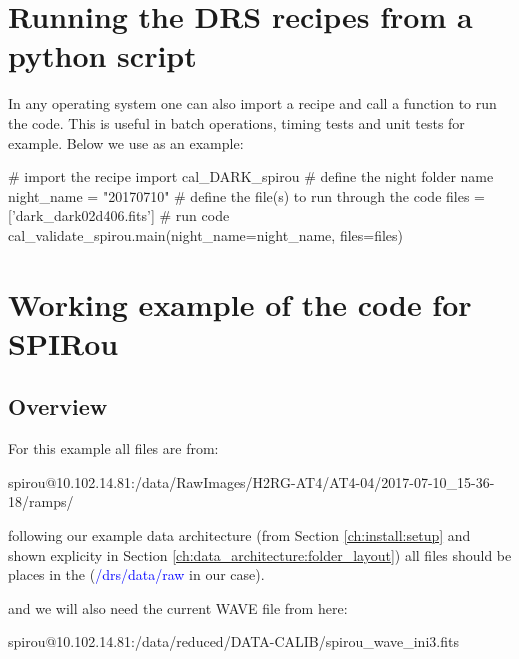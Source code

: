 \section{Running the DRS recipes from a python script}
\label{chapter:using_the_drs:script}

In any operating system one can also import a recipe and call a function to run the code. This is useful in batch operations, timing tests and unit tests for example. Below we use \calDARK as an example:

\begin{pythonbox}
# import the recipe
import cal_DARK_spirou
# define the night folder name
night_name = "20170710"
# define the file(s) to run through the code
files = ['dark_dark02d406.fits']
# run code
cal_validate_spirou.main(night_name=night_name, files=files)
\end{pythonbox}


\section{Working example of the code for SPIRou}
\label{chapter:using_the_drs:working_example}

\subsection{Overview}
\label{chapter:using_the_drs:working_example:overview}

For this example all files are from:
\begin{cmdbox}
spirou@10.102.14.81:/data/RawImages/H2RG-AT4/AT4-04/2017-07-10_15-36-18/ramps/
\end{cmdbox} 

\noindent following our example data architecture (from Section \ref{ch:install:setup} and shown explicity in Section \ref{ch:data_architecture:folder_layout}) all files should be places in the  (\textcolor{blue}{/drs/data/raw} in our case).

\noindent and we will also need the current WAVE file from here:
\begin{cmdbox}
spirou@10.102.14.81:/data/reduced/DATA-CALIB/spirou_wave_ini3.fits
\end{cmdbox}


